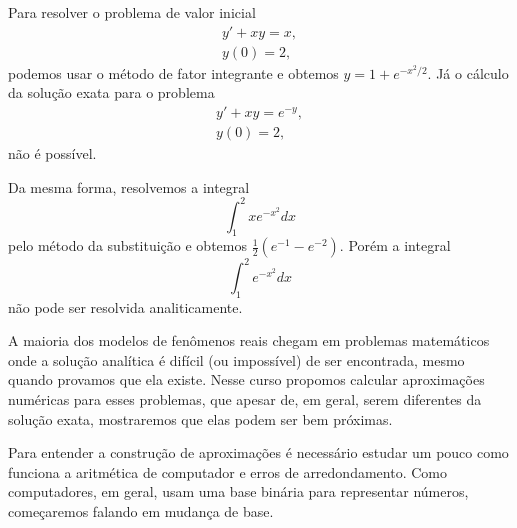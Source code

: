 Para resolver o problema de valor inicial 
$$
\begin{array}{l}
y'+xy=x,\\
y(0)=2,
\end{array}
$$
podemos usar o método de fator integrante e obtemos $y=1+e^{-x^2/2}$. Já o cálculo da solução exata para o problema 
$$
\begin{array}{l}
y'+xy=e^{-y},\\
y(0)=2,
\end{array}
$$
não é possível.

Da mesma forma, resolvemos a integral
$$
\int_1^2xe^{-x^2}dx
$$
pelo método da substituição e obtemos $\frac{1}{2}(e^{-1}-e^{-2})$. Porém a integral
$$
\int_1^2 e^{-x^2} dx
$$
não pode ser resolvida analiticamente.

A maioria dos modelos de fenômenos reais chegam em problemas matemáticos onde a solução analítica é difícil (ou impossível) de ser encontrada, mesmo quando provamos que ela existe. Nesse curso propomos calcular aproximações numéricas para esses problemas, que apesar de, em geral, serem diferentes da solução exata, mostraremos que elas podem ser bem próximas.

Para entender a construção de aproximações é necessário estudar um pouco como funciona a aritmética de computador e erros de arredondamento. Como computadores, em geral, usam uma base binária para representar números, começaremos falando em mudança de base.


%
